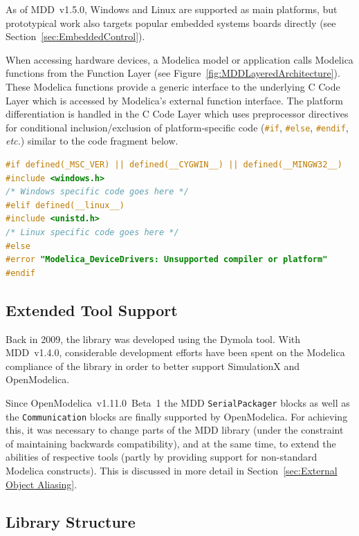 \documentclass{resources/modelica}
\newcommand{\clang}[1]{\lstinline[language=c]|#1|}
\newcommand{\modelica}[1]{\lstinline[language=modelica]|#1|}
\begin{document}
As of MDD~v1.5.0, Windows and Linux are supported as main platforms,
but prototypical work also targets popular embedded systems boards directly (see
Section~\ref{sec:EmbeddedControl}).

When accessing hardware devices, a Modelica model or
application calls Modelica functions from the \textsf{Function Layer} (see
Figure~\ref{fig:MDDLayeredArchitecture}). These Modelica functions provide a
generic interface to the underlying \textsf{C Code Layer} which is accessed by
Modelica's external function interface.
The platform differentiation is handled in the \textsf{C Code Layer} which
uses preprocessor directives for conditional inclusion/exclusion of
platform-specific code (\mbox{\clang{#if}}, \mbox{\clang{#else}},
\mbox{\clang{#endif}}, \textit{etc.}) similar to the code fragment below.
\begin{lstlisting}[language=C]
#if defined(_MSC_VER) || defined(__CYGWIN__) || defined(__MINGW32__)
#include <windows.h>
/* Windows specific code goes here */
#elif defined(__linux__)
#include <unistd.h>
/* Linux specific code goes here */
#else
#error "Modelica_DeviceDrivers: Unsupported compiler or platform"
#endif
\end{lstlisting}

\subsection{Extended Tool Support}
\label{sec:ExtendedToolSupport}

Back in 2009, the library was developed using the Dymola tool. With MDD~v1.4.0,
considerable development efforts have been spent on the Modelica compliance of
the library in order to better support SimulationX and OpenModelica.

Since OpenModelica~v1.11.0~Beta~1 the MDD \modelica{SerialPackager} blocks as well as the \modelica{Communication} blocks are finally
supported by OpenModelica. For achieving this, it was necessary to change parts
of the MDD library (under the constraint of maintaining backwards compatibility),
and at the same time, to extend the abilities of respective tools (partly by
providing support for non-standard Modelica constructs). This is discussed in more detail in
Section~\ref{sec:External Object Aliasing}.

\subsection{Library Structure}
\label{sec:LibraryStructure}
\end{document}
